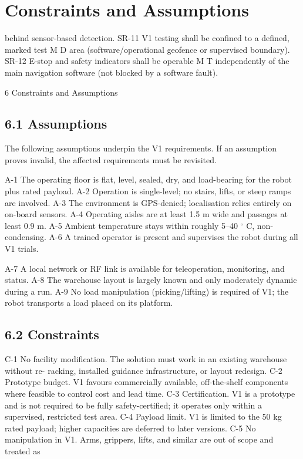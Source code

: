 \chapter{Constraints and Assumptions}

behind sensor-based detection. SR-11       V1 testing shall be confined to a defined, marked test              M           D area (software/operational geofence or supervised boundary). SR-12       E-stop and safety indicators shall be operable                      M           T independently of the main navigation software (not blocked by a software fault).

6 Constraints and Assumptions

\section*{6.1 Assumptions}

The following assumptions underpin the V1 requirements. If an assumption proves invalid, the affected requirements must be revisited.

A-1 The operating floor is flat, level, sealed, dry, and load-bearing for the robot plus rated payload. A-2 Operation is single-level; no stairs, lifts, or steep ramps are involved. A-3 The environment is GPS-denied; localisation relies entirely on on-board sensors. A-4 Operating aisles are at least 1.5 m wide and passages at least 0.9 m. A-5 Ambient temperature stays within roughly 5--40 $^\circ$ C, non-condensing. A-6 A trained operator is present and supervises the robot during all V1 trials.

A-7 A local network or RF link is available for teleoperation, monitoring, and status. A-8 The warehouse layout is largely known and only moderately dynamic during a run. A-9 No load manipulation (picking/lifting) is required of V1; the robot transports a load placed on its platform.

\section*{6.2 Constraints}

C-1 No facility modification. The solution must work in an existing warehouse without re- racking, installed guidance infrastructure, or layout redesign. C-2 Prototype budget. V1 favours commercially available, off-the-shelf components where feasible to control cost and lead time. C-3 Certification. V1 is a prototype and is not required to be fully safety-certified; it operates only within a supervised, restricted test area. C-4 Payload limit. V1 is limited to the 50 kg rated payload; higher capacities are deferred to later versions. C-5 No manipulation in V1. Arms, grippers, lifts, and similar are out of scope and treated as

